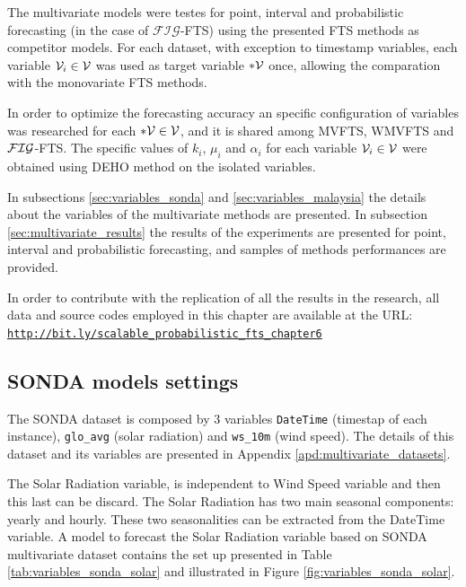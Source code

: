The multivariate models were testes for point, interval and probabilistic forecasting (in the case of $\mathcal{FIG}$-FTS) using the presented FTS methods as competitor models. For each dataset, with exception to timestamp variables, each variable $\mathcal{V}_i \in \mathcal{V}$ was used as target variable $*\mathcal{V}$ once, allowing the comparation with the monovariate FTS methods. 

In order to optimize the forecasting accuracy an specific configuration of variables was researched for each $*\mathcal{V} \in \mathcal{V}$, and it is shared among MVFTS, WMVFTS and  $\mathcal{FIG}$-FTS. The specific values of $k_i$, $\mu_i$ and $\alpha_i$ for each variable $\mathcal{V}_i \in \mathcal{V}$ were obtained using DEHO method on the isolated variables.

In subsections \ref{sec:variables_sonda} and \ref{sec:variables_malaysia} the details about the variables of the multivariate methods are presented. In subsection \ref{sec:multivariate_results} the results of the experiments are presented for point, interval and probabilistic forecasting, and samples of methods performances are provided.

In order to contribute with the replication of all the results in the research, all data and source codes employed in this chapter are available at the URL:
\texttt{\url{http://bit.ly/scalable_probabilistic_fts_chapter6}}

\subsection{SONDA models settings}
\label{sec:variables_sonda}

The SONDA dataset is composed by 3 variables \texttt{DateTime} (timestap of each instance), \texttt{glo\_avg} (solar radiation) and \texttt{ws\_10m} (wind speed). The details of this dataset and its variables are presented in Appendix \ref{apd:multivariate_datasets}. 

The Solar Radiation variable, is independent to Wind Speed variable and then this last can be discard. The Solar Radiation has two main seasonal components: yearly and hourly. These two seasonalities can be extracted from the DateTime variable.  A model to forecast the Solar Radiation variable based on SONDA  multivariate dataset contains the set up presented in Table \ref{tab:variables_sonda_solar} and illustrated in Figure \ref{fig:variables_sonda_solar}.

